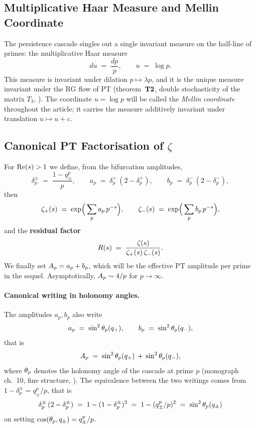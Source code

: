 \subsection{Multiplicative Haar Measure and Mellin Coordinate}
\label{sec:haar}

The persistence cascade singles out a single invariant measure on the
half-line of primes: the multiplicative Haar measure
\begin{equation}
du \;=\; \dfrac{dp}{p}, \qquad u \;=\; \log p.
\label{eq:haar_mult}
\end{equation}
This measure is invariant under dilation $p \mapsto \lambda p$, and it is
the unique measure invariant under the RG flow of PT (theorem~$\textbf{T2}$,
double stochasticity of the matrix $T_3$, \cite{PT_M1}). The
coordinate $u = \log p$ will be called the \emph{Mellin coordinate}
throughout the article; it carries the measure additively invariant under
translation $u \mapsto u + c$.

\subsection{Canonical PT Factorisation of $\zeta$}
\label{sec:factorisation}

For $\operatorname{Re}(s) > 1$ we define, from the bifurcation amplitudes,
\begin{equation}
\delta_p^{\pm} \;=\; \dfrac{1 - q_{\pm}^{p}}{p}, \qquad
a_p \;=\; \delta_p^{+}\,(2 - \delta_p^{+}), \qquad
b_p \;=\; \delta_p^{-}\,(2 - \delta_p^{-}),
\label{eq:apbp}
\end{equation}
then
\begin{equation}
\zeta_{+}(s) \;=\; \exp\!\Big(\sum_{p} a_p\,p^{-s}\Big), \qquad
\zeta_{-}(s) \;=\; \exp\!\Big(\sum_{p} b_p\,p^{-s}\Big),
\label{eq:zetapm}
\end{equation}
and the \textbf{residual factor}
\begin{equation}
R(s) \;=\; \dfrac{\zeta(s)}{\zeta_{+}(s)\,\zeta_{-}(s)}.
\label{eq:Rres_def}
\end{equation}
We finally set $A_p = a_p + b_p$, which will be the effective PT
amplitude per prime in the sequel. Asymptotically, $A_p \sim 4/p$ for
$p \to \infty$.

\paragraph{Canonical writing in holonomy angles.}
The amplitudes $a_p, b_p$ also write
\begin{equation}
a_p \;=\; \sin^{2}\theta_{p}(q_{+}), \qquad b_p \;=\; \sin^{2}\theta_{p}(q_{-}),
\label{eq:apbp_sinp}
\end{equation}
that is
\begin{equation}
A_p \;=\; \sin^{2}\theta_{p}(q_{+}) \,+\, \sin^{2}\theta_{p}(q_{-}),
\label{eq:Ap_holonomie}
\end{equation}
where $\theta_{p}$ denotes the holonomy angle of the cascade at prime $p$
(monograph ch.~10, fine structure, \cite{PT_Foundations}). The equivalence
between the two writings comes from $1 - \delta_p^{\pm} = q_{\pm}^{p}/p$,
that is
\[
\delta_p^{\pm}\,(2 - \delta_p^{\pm}) \;=\; 1 - (1 - \delta_p^{\pm})^{2} \;=\; 1 - (q_{\pm}^{p}/p)^{2} \;=\; \sin^{2}\theta_{p}(q_{\pm})
\]
on setting $\cos(\theta_{p}, q_{\pm}) = q_{\pm}^{p}/p$.

